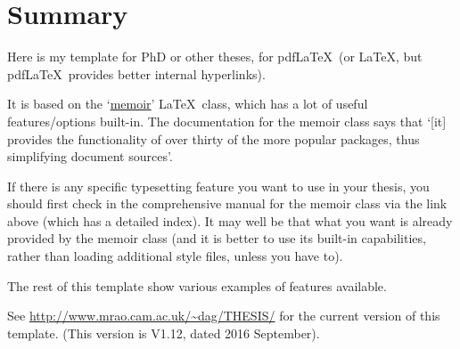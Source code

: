 \chapter*{Summary}


Here is my template for PhD or other theses, for pdf\LaTeX\ (or \LaTeX,
but pdf\LaTeX\ provides better internal hyperlinks).

It is based on the `\href{http://www.ctan.org/pkg/memoir}{memoir}'
\LaTeX\ class, which has a lot of useful features/options built-in. The
documentation for the memoir class says that `[it] provides the
functionality of over thirty of the more popular packages, thus
simplifying document sources'.

If there is any specific typesetting feature you want to use in your
thesis, you should first check in the comprehensive manual for the
memoir class via the link above (which has a detailed index). It may
well be that what you want is already provided by the memoir class (and
it is better to use its built-in capabilities, rather than loading
additional style files, unless you have to).

The rest of this template show various examples of features available.

See \url{http://www.mrao.cam.ac.uk/~dag/THESIS/} for the current version
of this template. (This version is V1.12, dated 2016 September).

\cleardoublepage

\endinput

